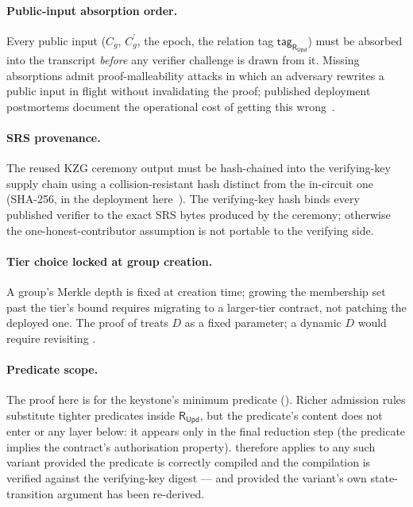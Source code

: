 \documentclass[11pt,a4paper]{article}
\theoremstyle{plain}
\theoremstyle{definition}
\newcommand{\Cg}{C_g}
\newcommand{\Cgp}{{C_g^{\prime}}}
\newcommand{\RUpd}{\mathsf{R}_{\mathsf{Upd}}}
\begin{document}
\paragraph{Public-input absorption order.} Every public input
($\Cg$, $\Cgp$, the epoch, the relation tag $\mathsf{tag}_{\RUpd}$)
must be absorbed into the transcript \emph{before} any verifier
challenge is drawn from it. Missing absorptions admit
proof-malleability attacks in which an adversary rewrites a
public input in flight without invalidating the proof; published
deployment postmortems document the operational cost of getting
this wrong~\cite{don-2019-fiat-shamir}.

\paragraph{SRS provenance.} The reused KZG ceremony output must
be hash-chained into the verifying-key supply chain using a
collision-resistant hash distinct from the in-circuit one
(SHA-256, in the deployment here~\cite{nist-fips-180-4}). The
verifying-key hash binds every published verifier to the exact
SRS bytes produced by the ceremony; otherwise the
one-honest-contributor assumption is not portable to the
verifying side.

\paragraph{Tier choice locked at group creation.} A group's
Merkle depth is fixed at creation time; growing the membership
set past the tier's bound requires migrating to a larger-tier
contract, not patching the deployed one. The proof of
 treats $D$ as a fixed parameter; a dynamic $D$
would require revisiting .

\paragraph{Predicate scope.} The proof here is for the
keystone's minimum predicate (). Richer admission
rules substitute tighter predicates inside $\RUpd$, but the
predicate's content does not enter  or any
layer below: it appears only in the final reduction step (the
predicate implies the contract's authorisation property).
 therefore applies to any such variant
provided the predicate is correctly compiled and the
compilation is verified against the verifying-key digest --- and
provided the variant's own state-transition argument has been
re-derived.
\end{document}
